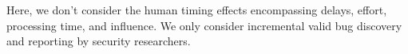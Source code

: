 
Here, we don't consider the human timing effects encompassing delays, effort, processing time, and influence. We only consider incremental valid bug discovery and reporting by security researchers.

